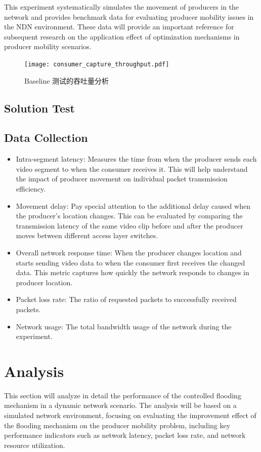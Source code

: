 \documentclass[conference]{IEEEtran}
\begin{document}
This experiment systematically simulates the movement of producers in the network and provides benchmark data for evaluating producer mobility issues in the NDN environment. These data will provide an important reference for subsequent research on the application effect of optimization mechanisms in producer mobility scenarios.

\begin{figure}[H]
    \centering
    \texttt{[image: consumer\_capture\_throughput.pdf]} %
    \caption{Baseline 测试的吞吐量分析}
    \label{fig:baseline-throughput}
\end{figure}

\subsection{Solution Test}

\subsection{Data Collection}
\begin{itemize}
    \item Intra-segment latency: Measures the time from when the producer sends each video segment to when the consumer receives it. This will help understand the impact of producer movement on individual packet transmission efficiency.
    \item Movement delay: Pay special attention to the additional delay caused when the producer's location changes. This can be evaluated by comparing the transmission latency of the same video clip before and after the producer moves between different access layer switches.
    \item Overall network response time: When the producer changes location and starts sending video data to when the consumer first receives the changed data. This metric captures how quickly the network responds to changes in producer location.
    \item Packet loss rate: The ratio of requested packets to successfully received packets.
    \item Network usage: The total bandwidth usage of the network during the experiment.
\end{itemize}

\section{Analysis}
This section will analyze in detail the performance of the controlled flooding mechanism in a dynamic network scenario. The analysis will be based on a simulated network environment, focusing on evaluating the improvement effect of the flooding mechanism on the producer mobility problem, including key performance indicators such as network latency, packet loss rate, and network resource utilization.
\end{document}
